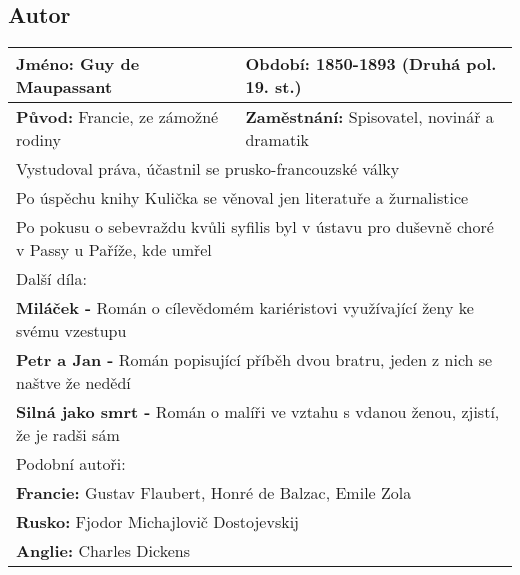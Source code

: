 \subsection*{Autor}
\begin{tabularx}{\linewidth}{l|l}
    \textbf{Jméno:} Guy de Maupassant          & \textbf{Období:} 1850-1893 (Druhá pol. 19. st.)                        \\
    \hline
    \textbf{Původ:} Francie, ze zámožné rodiny & \textbf{Zaměstnání:} Spisovatel, novinář a dramatik                    \\
    \hline
    \multicolumn{2}{l}{Vystudoval práva, účastnil se prusko-francouzské války}                                          \\
    \multicolumn{2}{l}{Po úspěchu knihy Kulička se věnoval jen literatuře a žurnalistice}                               \\
    \multicolumn{2}{l}{Po pokusu o sebevraždu kvůli syfilis byl v ústavu pro duševně choré v Passy u Paříže, kde umřel} \\
    \hline
    \multicolumn{2}{l}{Další díla:}                                                                                     \\
    \multicolumn{2}{l}{\textbf{Miláček -} Román o cílevědomém kariéristovi využívající ženy ke svému vzestupu}          \\
    \multicolumn{2}{l}{\textbf{Petr a Jan -} Román popisující příběh dvou bratru, jeden z nich se naštve že nedědí}     \\
    \multicolumn{2}{l}{\textbf{Silná jako smrt -} Román o malíři ve vztahu s vdanou ženou, zjistí, že je radši sám}     \\
    \hline
    \multicolumn{2}{l}{Podobní autoři:}                                                                                 \\
    \multicolumn{2}{l}{\textbf{Francie:} Gustav Flaubert, Honré de Balzac, Emile Zola}                                  \\
    \multicolumn{2}{l}{\textbf{Rusko:} Fjodor Michajlovič Dostojevskij}                                                 \\
    \multicolumn{2}{l}{\textbf{Anglie:} Charles Dickens}                                                                \\
\end{tabularx}